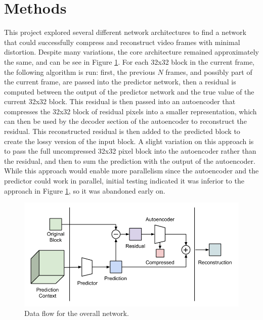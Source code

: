 \documentclass[10pt,twocolumn,letterpaper]{article}
\begin{document}
\section{Methods}
This project explored several different network architectures to find a network that could successfully compress and reconstruct video frames with minimal distortion. Despite many variations, the core architecture remained approximately the same, and can be see in Figure \ref{fig:core}. For each 32x32 block in the current frame, the following algorithm is run: first, the previous $N$ frames, and possibly part of the current frame, are passed into the predictor network, then a residual is computed between the output of the predictor network and the true value of the current 32x32 block. This residual is then passed into an autoencoder that compresses the 32x32 block of residual pixels into a smaller representation, which can then be used by the decoder section of the autoencoder to reconstruct the residual. This reconstructed residual is then added to the predicted block to create the lossy version of the input block. A slight variation on this approach is to pass the full uncompressed 32x32 pixel block into the autoencoder rather than the residual, and then to sum the prediction with the output of the autoencoder. While this approach would enable more parallelism since the autoencoder and the predictor could work in parallel, initial testing indicated it was inferior to the approach in Figure \ref{fig:core}, so it was abandoned early on.

\begin{figure}[t]
\begin{center}
  \includegraphics[width=\linewidth]{core_flow}
\end{center}
   \caption{Data flow for the overall network.}
   \label{fig:core}
\end{figure}
\end{document}
